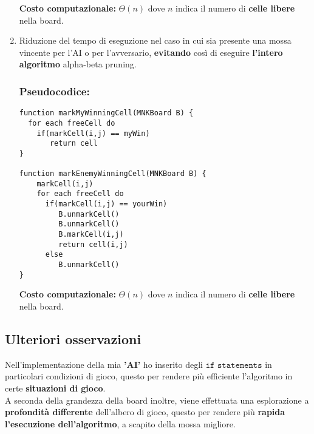 \documentclass{article}
\begin{document}
\begin{enumerate}
        \textbf{Costo computazionale:} $\Theta(n)$ dove $n$ indica il numero di \textbf{celle libere} nella board.
        
        \item Riduzione del tempo di eseguzione nel caso in cui sia presente una mossa vincente per l'AI o per l'avversario, \textbf{evitando} così di eseguire \textbf{l'intero algoritmo} alpha-beta pruning. 
        
    \subsubsection{Pseudocodice:}
    \lstset{language=java}
    \begin{lstlisting}[frame=single]  
function markMyWinningCell(MNKBoard B) {
  for each freeCell do
    if(markCell(i,j) == myWin) 
       return cell
}

function markEnemyWinningCell(MNKBoard B) {
    markCell(i,j)
    for each freeCell do
      if(markCell(i,j) == yourWin) 
         B.unmarkCell()
         B.unmarkCell()	       
         B.markCell(i,j)   
         return cell(i,j)
      else 
         B.unmarkCell()       
}

    \end{lstlisting}
        
        \textbf{Costo computazionale:} $\Theta(n)$ dove $n$ indica il numero di \textbf{celle libere} nella board. 
    \end{enumerate}
    
\subsection{Ulteriori osservazioni}

Nell'implementazione della mia \textbf{'AI'} ho inserito degli $\texttt{if statements}$ in particolari condizioni di gioco, questo per rendere più efficiente l'algoritmo in certe \textbf{situazioni di gioco}. \\
A seconda della grandezza della board inoltre, viene effettuata una esplorazione a \textbf{profondità differente} dell'albero di gioco, questo per rendere più \textbf{rapida l'esecuzione dell'algoritmo}, a scapito della mossa migliore.



\end{document}
